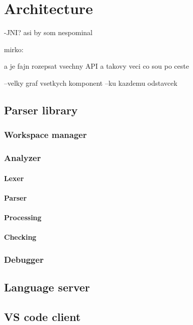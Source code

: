 \chapter{Architecture}

-JNI? asi by som nespominal

mirko:

a je fajn rozepsat vsechny API a takovy veci co sou po ceste

--velky graf vsetkych komponent
--ku kazdemu odstavcek 

\section{Parser library}

\subsection{Workspace manager}

\subsection{Analyzer}

\subsubsection{Lexer}
\subsubsection{Parser}
\subsubsection{Processing}
\subsubsection{Checking}

\subsection{Debugger}

\section{Language server}

\section{VS code client}